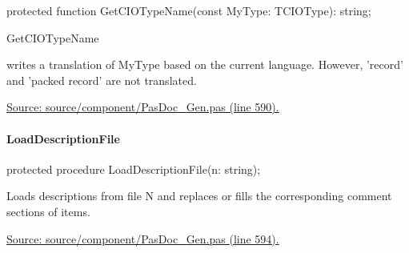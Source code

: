 \documentclass{report}
\newif\ifpdf
\begin{document}
\label{PasDoc_Gen.TDocGenerator-GetCIOTypeName}
\begin{list}{}{
\setlength{\itemindent}{0cm}
\setlength{\listparindent}{0cm}
\setlength{\leftmargin}{\evensidemargin}
\addtolength{\leftmargin}{\tmplength}
\settowidth{\labelsep}{X}
\addtolength{\leftmargin}{\labelsep}
\setlength{\labelwidth}{\tmplength}
}
\item[\textbf{Declaration}\hfill]
\ifpdf
\begin{flushleft}
\fi
\begin{ttfamily}
protected function GetCIOTypeName(const MyType: TCIOType): string;\end{ttfamily}

\ifpdf
\end{flushleft}
\fi

\par
\item[\textbf{Description}]
\begin{ttfamily}GetCIOTypeName\end{ttfamily} writes a translation of MyType based on the current language. However, 'record' and 'packed record' are not translated.\par
\href{https://github.com/pasdoc/pasdoc/blob/master/source/component/PasDoc_Gen.pas#L590}{Source: source/component/PasDoc{\_}Gen.pas (line 590).}

\end{list}
\paragraph*{LoadDescriptionFile}\hspace*{\fill}

\label{PasDoc_Gen.TDocGenerator-LoadDescriptionFile}
\begin{list}{}{
\setlength{\itemindent}{0cm}
\setlength{\listparindent}{0cm}
\setlength{\leftmargin}{\evensidemargin}
\addtolength{\leftmargin}{\tmplength}
\settowidth{\labelsep}{X}
\addtolength{\leftmargin}{\labelsep}
\setlength{\labelwidth}{\tmplength}
}
\item[\textbf{Declaration}\hfill]
\ifpdf
\begin{flushleft}
\fi
\begin{ttfamily}
protected procedure LoadDescriptionFile(n: string);\end{ttfamily}

\ifpdf
\end{flushleft}
\fi

\par
\item[\textbf{Description}]
Loads descriptions from file N and replaces or fills the corresponding comment sections of items.\par
\href{https://github.com/pasdoc/pasdoc/blob/master/source/component/PasDoc_Gen.pas#L594}{Source: source/component/PasDoc{\_}Gen.pas (line 594).}

\end{list}
\end{document}
